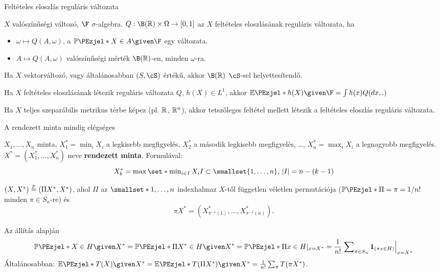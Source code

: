 \documentclass[aspectratio=169,notheorems,9pt,\option]{beamer}
\begin{document}
\begin{frame}{Feltételes eloszlás reguláris változata}
  \begin{df}
    $X$ valószínűségi változó, $\F$ $\sigma$-algebra. $Q:\B(\real)\times\Omega\to[0,1]$ az $X$ feltételes 
    eloszlásának reguláris változata, ha 
    \begin{itemize}[<*>]
      \item $\omega\mapsto Q(A,\omega)$, a $\P{X\in A\given \F}$ egy változata.
      \item $A\mapsto Q(A,\omega)$ valószínűségi mérték $\B(\real)$-en, minden $\omega$-ra.  
    \end{itemize}
  \end{df}
  \continue
  Ha $X$ vektorváltozó, vagy  általánosabban $(S,\cS)$ értékű, akkor $\B(\real)$ $\cS$-sel helyettesítendő. 
  \begin{proposition}
    Ha $X$ feltételes eloszlásának létezik reguláris változata $Q$, $h(X)\in L^1$, akkor $\E{h(X)\given \F}=\int h(x) Q(dx,.)$
  \end{proposition}
  
  \begin{theorem}
    Ha $X$ teljes szeparábilis metrikus térbe képez (pl. $\mathbb{R}$, $\mathbb{R}^n$), akkor tetszőleges feltétel 
    mellett létezik a feltételes eloszlás reguláris változata.
  \end{theorem}
  
\end{frame}

\begin{frame}{A rendezett minta mindig elégséges}
  \begin{df}
    $X_1,\dots,X_n$ minta, 
    $X_1^*=\min_i X_i$ a legkisebb megfigyelés,  
    $X_2^*$ a második legkisebb megfigyelés, \ldots, $X_n^*=\max_i X_i$ 
    a legnagyobb megfigyelés.
    $X^*=(X_1^*,\dots,X_n^*)$ neve \textbf{rendezett minta}. 
    Formulával:
    \begin{displaymath}
      X_k^*=\max\set*{\min\nolimits_{i\in I} X_i}{I\subset\smallset{1,\dots,n},\, \abs*{I}=n-(k-1)} 
    \end{displaymath}
  \end{df}
  \begin{proposition}
    $(X,X^*)\stackrel{p}{=}(\Pi X^*,X^*)$, ahol $\Pi$ az $\smallset*{1,\dots,n}$ indexhalmaz 
    $X$-től független véletlen permutációja ($\P{\Pi=\pi}=1/n!$ minden $\pi\in S_n$-re) és 
    \begin{displaymath}
      \pi X^*=(X^*_{\pi^{-1}(1)},\dots,X^*_{\pi^{-1}(n)}).
    \end{displaymath}
  \end{proposition}
  \continue
  Az állítás alapján
  \begin{displaymath}
    \P{X\in H\given X^*}=\P{\Pi X^*\in H\given X^*}=\P{\Pi x\in H}|_{x=X^*}
    =\frac1{n!}\left.\sum\nolimits_{\pi\in S_n} \I{\pi x\in H}\right|_{x=X^*}
  \end{displaymath}
  Általánosabban: $\E{T(X)\given X^*}=\E{T(\Pi X^*)\given X^*}=\frac1{n!}\sum_{\pi} T(\pi X^*)$.
\end{frame}
\end{document}
